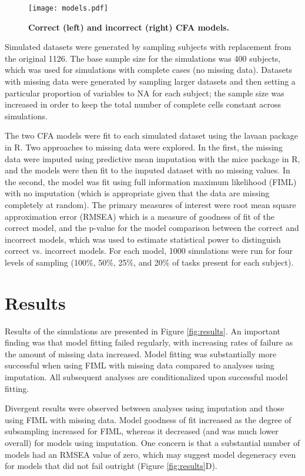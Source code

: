 \documentclass[11pt, oneside]{article}   	%
\begin{document}
\begin{figure}[!h]
\caption{\textbf{Correct (left) and incorrect (right) CFA models.}}
\centering
\texttt{[image: models.pdf]}
\label{fig:models}
\end{figure}

Simulated datasets were generated by sampling subjects with replacement from the original 1126.  The base sample size for the simulations was 400 subjects, which was used for simulations with complete cases (no missing data).  Datasets with missing data were generated by sampling larger datasets and then setting a particular proportion of variables to NA for each subject; the sample size was increased in order to keep the total number of complete cells constant across simulations.  

The two CFA models were fit to each simulated dataset using the lavaan package in R. Two approaches to missing data were explored.  In the first, the missing data were imputed using predictive mean imputation with the mice package in R, and the models were then fit to the imputed dataset with no missing values.  In the second, the model was fit using full information maximum likelihood (FIML) with no imputation (which is appropriate given that the data are missing completely at random).  The primary measures of interest were root mean square approximation error (RMSEA) which is a measure of goodness of fit of the correct model, and the p-value for the model comparison between the correct and incorrect models, which was used to estimate statistical power to distinguish correct vs. incorrect models.  For each model, 1000 simulations were run for four levels of sampling (100\%, 50\%, 25\%, and 20\% of tasks present for each subject).  

\section{Results}

Results of the simulations are presented in Figure \ref{fig:results}.  An important finding was that model fitting failed regularly, with increasing rates of failure as the amount of missing data increased.  Model fitting was substantially more successful when using FIML with missing data compared to analyses using imputation.  All subsequent analyses are conditionalized upon successful model fitting.

Divergent results were observed between analyses using imputation and those using FIML with missing data.  Model goodness of fit increased as the degree of subsampling increased for FIML, whereas it decreased (and was much lower overall) for models using imputation.  One concern is that a substantial number of models had an RMSEA value of zero, which may suggest model degeneracy even for models that did not fail outright (Figure \ref{fig:results}D).  
\end{document}
